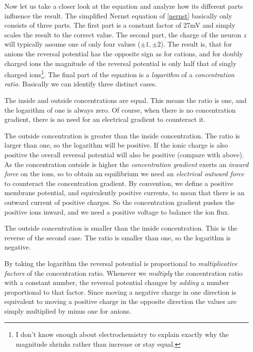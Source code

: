 Now let us take a closer look at the equation and analyze how its different parts influence the result. The simplified Nernst equation of \ref{nernst} basically only consists of three parts. The first part is a constant factor of 27\si{mV} and simply scales the result to the correct value. The second part, the charge of the neuron $z$ will typically assume one of only four values ($\pm 1, \pm 2$). The result is, that for anions the reversal potential has the opposite sign as for cations, and for doubly charged ions the magnitude of the reversal potential is only half that of singly charged ions\footnote{I don't know enough about electrochemistry to explain exactly why the magnitude shrinks rather than increase or stay equal.}. The final part of the equation is a \textit{logarithm} of a \textit{concentration ratio}. Basically we can identify three distinct cases.
\begin{enumerate*}
\item The inside and outside concentrations are equal. This means the ratio is one, and the logarithm of one is always zero. Of course, when there is no concentration gradient, there is no need for an electrical gradient to counteract it.
\item The outside concentration is greater than the inside concentration. The ratio is larger than one, so the logarithm will be positive. If the ionic charge is also positive the overall reversal potential will also be positive (compare with  above). As the concentration outside is higher the \textit{concentration gradient} exerts an \textit{inward force} on the ions, so to obtain an equilibrium we need an \textit{electrical outward force} to counteract the concentration gradient. By convention, we define a positive membrane potential, and equivalently positive currents, to mean that there is an outward current of positive charges. So the concentration gradient pushes the positive ions inward, and we need a positive voltage to balance the ion flux.
\item The outside concentration is smaller than the inside concentration. This is the reverse of the second case. The ratio is smaller than one, so the logarithm is negative.
\end{enumerate*}
By taking the logarithm the reversal potential is proportional to \textit{multiplicative factors} of the concentration ratio. Whenever we \textit{multiply} the concentration ratio with a constant number, the reversal potential changes by \textit{adding} a number proportional to that factor. Since moving a negative charge in one direction is equivalent to moving a positive charge in the opposite direction the values are simply multiplied by minus one for anions.

